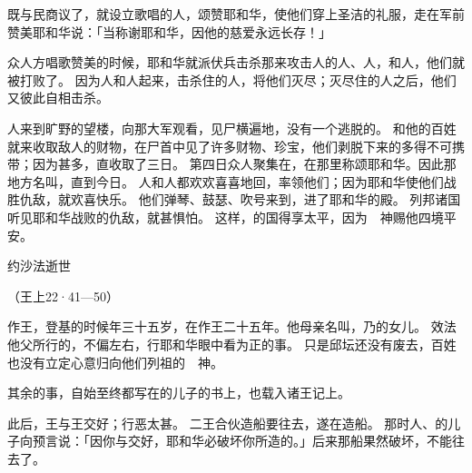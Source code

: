 {既与民商议了，就设立歌唱的人，颂赞耶和华，使他们穿上圣洁的礼服，走在军前赞美耶和华说：「当称谢耶和华，因他的慈爱永远长存！」
\par }{\PP {}众人方唱歌赞美的时候，耶和华就派伏兵击杀那来攻击{}人的{}人、{}人，和{}人，他们就被打败了。
因为{}人和{}人起来，击杀住{}的人，将他们灭尽；灭尽住{}的人之后，他们又彼此自相击杀。
\par }{\PP {}人来到旷野的望楼，向那大军观看，见尸横遍地，没有一个逃脱的。
和他的百姓就来收取敌人的财物，在尸首中见了许多财物、珍宝，他们剥脱下来的多得不可携带；因为甚多，直收取了三日。
第四日众人聚集在{}，在那里称颂耶和华。因此那地方名叫{}，直到今日。
人和{}人都欢欢喜喜地回{}，{}率领他们；因为耶和华使他们战胜仇敌，就欢喜快乐。
他们弹琴、鼓瑟、吹号来到{}，进了耶和华的殿。
列邦诸国听见耶和华战败{}的仇敌，就甚惧怕。
这样，{}的国得享太平，因为　神赐他四境平安。
\par }{\SH 约沙法逝世
\par }{\R （王上22·41—50）
\par }{\PP {}作{}王，登基的时候年三十五岁，在{}作王二十五年。他母亲名叫{}，乃{}的女儿。
效法他父{}所行的，不偏左右，行耶和华眼中看为正的事。
只是邱坛还没有废去，百姓也没有立定心意归向他们列祖的　神。
\par }{\PP {}其余的事，自始至终都写在{}的儿子{}的书上，也载入{}诸王记上。
\par }{\PP {}此后，{}王{}与{}王{}交好；{}行恶太甚。
二王合伙造船要往{}去，遂在{}造船。
那时{}人、{}的儿子{}向{}预言说：「因你与{}交好，耶和华必破坏你所造的。」后来那船果然破坏，不能往{}去了。

}
